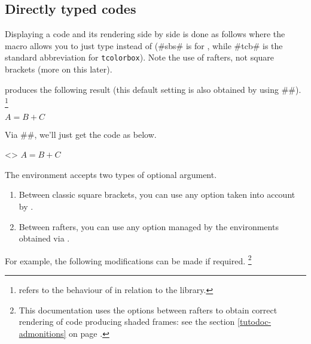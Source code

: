 \documentclass{tutodoc}
\begin{document}
\subsection{Directly typed codes}

\begin{tdocexa}
    Displaying a code and its rendering side by side is done as follows where the macro  allows you to just type  instead of  (\tdoclatexin#sbs# is for , while \tdoclatexin#tcb# is the standard abbreviation for \texttt{tcolorbox}). Note the use of rafters, not square brackets (more on this later).

\end{tdocexa}


\begin{tdocexa}[Following]
     produces the following result (this default setting is also obtained by using \tdoclatexin##).%
    \footnote{
         refers to the  behaviour of  in relation to the  library.
    }

    \begin{tdoclatex}
$A = B + C$
    \end{tdoclatex}
\end{tdocexa}


\begin{tdocexa}
    Via \tdoclatexin##, we'll just get the code as below.

    \begin{tdoclatex}<>
$A = B + C$
    \end{tdoclatex}
\end{tdocexa}


\begin{tdocexa}[Customise]
	The  environment accepts two types of optional argument.
	\begin{enumerate}
		\item Between classic square brackets, you can use any option taken into account by .

		\item Between rafters, you can use any option managed by the environments obtained via .
	\end{enumerate}

	For example, the following modifications can be made if required.%
	\footnote{
		This documentation uses the options between rafters to obtain correct rendering of code producing shaded frames: see the section \ref{tutodoc-admonitions} on page \pageref{tutodoc-admonitions}.
	}

\end{tdocexa}
\end{document}
